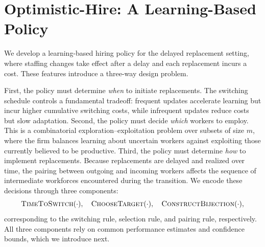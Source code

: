 \documentclass[opre,blindrev]{informs3}
\begin{document}
\section{Optimistic-Hire: A Learning-Based Policy}\label{sec:alg-desc}
We develop a learning-based hiring policy for the delayed replacement setting, where staffing changes take effect after a delay and each replacement incurs a cost. These features introduce a three-way design problem.

First, the policy must determine \emph{when} to initiate replacements. The switching schedule controls a fundamental tradeoff: frequent updates accelerate learning but incur higher cumulative switching costs, while infrequent updates reduce costs but slow adaptation. Second, the policy must decide \emph{which} workers to employ. This is a combinatorial exploration–exploitation problem over subsets of size \(m\), where the firm balances learning about uncertain workers against exploiting those currently believed to be productive. Third, the policy must determine \emph{how} to implement replacements. Because replacements are delayed and realized over time, the pairing between outgoing and incoming workers affects the sequence of intermediate workforces encountered during the transition. We encode these decisions through three components:
\[\textsc{TimeToSwitch}(\cdot),\quad \textsc{ChooseTarget}(\cdot),\quad \textsc{ConstructBijection}(\cdot),\]
corresponding to the switching rule, selection rule, and pairing rule, respectively. All three components rely on common performance estimates and confidence bounds, which we introduce next.

\vspace{-.1in}
\end{document}
